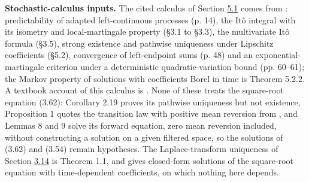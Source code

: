 \documentclass[11pt]{article}
\begin{document}
\textbf{Stochastic-calculus inputs.} The cited calculus of Section \hyperref[sec:5.1]{5.1} comes from \cite{bauerschmidt2020stochastic}: predictability of adapted left-continuous processes (p. 14), the Itô integral with its isometry and local-martingale property (§3.1 to §3.3), the multivariate Itô formula (§3.5), strong existence and pathwise uniqueness under Lipschitz coefficients (§5.2), convergence of left-endpoint sums (p. 48) and an exponential-martingale criterion under a deterministic quadratic-variation bound (pp. 60--61); the Markov property of solutions with coefficients Borel in time is \cite{vanhandel2007stochastic} Theorem 5.2.2. A textbook account of this calculus is \cite{revuz1999continuous}. None of these treats the square-root equation (3.62): \cite{altay2013lecture} Corollary 2.19 proves its pathwise uniqueness but not existence, \cite{malham2008square} Proposition 1 quotes the transition law with positive mean reversion from \cite{cox1985theory}, and \cite{feller1951singular} Lemmas 8 and 9 solve its forward equation, zero mean reversion included, without constructing a solution on a given filtered space, so the solutions of (3.62) and (3.54) remain hypotheses. The Laplace-transform uniqueness of Section \hyperref[sec:3.14]{3.14} is \cite{li2019continuous} Theorem 1.1, and \cite{maghsoodi1996solution} gives closed-form solutions of the square-root equation with time-dependent coefficients, on which nothing here depends.
\end{document}
